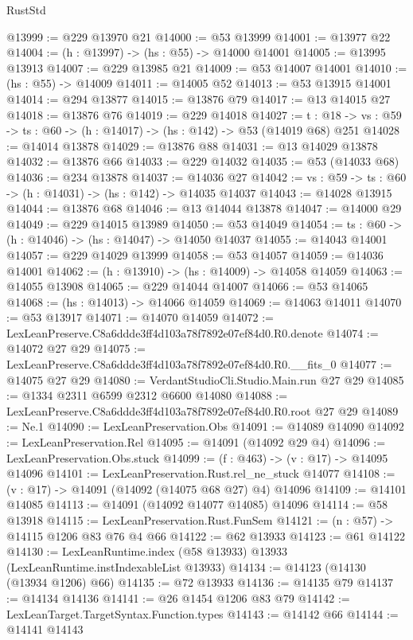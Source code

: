 \begin{lexlean}{RustStd}
\begin{coremodule}
@13999 := @229 @13970 @21
@14000 := @53 @13999
@14001 := @13977 @22
@14004 := (h : @13997) -> (hs : @55) -> @14000 @14001
@14005 := @13995 @13913
@14007 := @229 @13985 @21
@14009 := @53 @14007 @14001
@14010 := (hs : @55) -> @14009
@14011 := @14005 @52
@14013 := @53 @13915 @14001
@14014 := @294 @13877
@14015 := @13876 @79
@14017 := @13 @14015 @27
@14018 := @13876 @76
@14019 := @229 @14018
@14027 := {t : @18} ->
  {vs : @59} -> {ts : @60} -> (h : @14017) -> (hs : @142) -> @53 (@14019 @68) @251
@14028 := @14014 @13878
@14029 := @13876 @88
@14031 := @13 @14029 @13878
@14032 := @13876 @66
@14033 := @229 @14032
@14035 := @53 (@14033 @68)
@14036 := @234 @13878
@14037 := @14036 @27
@14042 := {vs : @59} -> {ts : @60} -> (h : @14031) -> (hs : @142) -> @14035 @14037
@14043 := @14028 @13915
@14044 := @13876 @68
@14046 := @13 @14044 @13878
@14047 := @14000 @29
@14049 := @229 @14015 @13989
@14050 := @53 @14049
@14054 := {ts : @60} -> (h : @14046) -> (hs : @14047) -> @14050 @14037
@14055 := @14043 @14001
@14057 := @229 @14029 @13999
@14058 := @53 @14057
@14059 := @14036 @14001
@14062 := (h : @13910) -> (hs : @14009) -> @14058 @14059
@14063 := @14055 @13908
@14065 := @229 @14044 @14007
@14066 := @53 @14065
@14068 := (hs : @14013) -> @14066 @14059
@14069 := @14063 @14011
@14070 := @53 @13917
@14071 := @14070 @14059
@14072 := LexLeanPreserve.C8a6ddde3ff4d103a78f7892e07ef84d0.R0.denote
@14074 := @14072 @27 @29
@14075 := LexLeanPreserve.C8a6ddde3ff4d103a78f7892e07ef84d0.R0.__fits_0
@14077 := @14075 @27 @29
@14080 := VerdantStudioCli.Studio.Main.run @27 @29
@14085 := @1334 @2311 @6599 @2312 @6600 @14080
@14088 := LexLeanPreserve.C8a6ddde3ff4d103a78f7892e07ef84d0.R0.root @27 @29
@14089 := Ne.{1}
@14090 := LexLeanPreservation.Obs
@14091 := @14089 @14090
@14092 := LexLeanPreservation.Rel
@14095 := @14091 (@14092 @29 @4)
@14096 := LexLeanPreservation.Obs.stuck
@14099 := (f : @463) -> (v : @17) -> @14095 @14096
@14101 := LexLeanPreservation.Rust.rel_ne_stuck @14077
@14108 := (v : @17) -> @14091 (@14092 (@14075 @68 @27) @4) @14096
@14109 := @14101 @14085
@14113 := @14091 (@14092 @14077 @14085) @14096
@14114 := @58 @13918
@14115 := LexLeanPreservation.Rust.FunSem
@14121 := (n : @57) -> @14115 @1206 @83 @76 @4 @66
@14122 := @62 @13933
@14123 := @61 @14122
@14130 := LexLeanRuntime.index (@58 @13933) @13933 (LexLeanRuntime.instIndexableList @13933)
@14134 := @14123 (@14130 (@13934 @1206) @66)
@14135 := @72 @13933
@14136 := @14135 @79
@14137 := @14134 @14136
@14141 := @26 @1454 @1206 @83 @79
@14142 := LexLeanTarget.TargetSyntax.Function.types
@14143 := @14142 @66
@14144 := @14141 @14143

\end{coremodule}
\end{lexlean}
